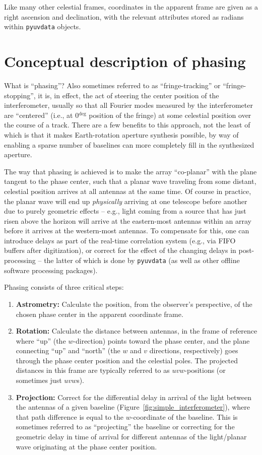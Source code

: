 \documentclass[11pt, oneside]{article}
\begin{document}
Like many other celestial frames, coordinates in the apparent frame are given as a right ascension and declination, with the relevant attributes stored as radians within \texttt{pyuvdata} objects.

\section{Conceptual description of phasing}\label{sec:concepts}
What is ``phasing''? Also sometimes referred to as ``fringe-tracking'' or ``fringe-stopping'', it is, in effect, the act of steering the center position of the interferometer, usually so that all Fourier modes measured by the interferometer are ``centered'' (i.e., at 0$^{\deg}$ position of the fringe) at some celestial position over the course of a track. There are a few benefits to this approach, not the least of which is that it makes Earth-rotation aperture synthesis possible, by way of enabling a sparse number of baselines can more completely fill in the synthesized aperture.

The way that phasing is achieved is to make the array ``co-planar'' with the plane tangent to the phase center, such that a planar wave traveling from some distant, celestial position arrives at all antennas at the same time. Of course in practice, the planar wave will end up \emph{physically} arriving at one telescope before another due to purely geometric effects -- e.g., light coming from a source that has just risen above the horizon will arrive at the eastern-most antennas within an array before it arrives at the western-most antennas. To compensate for this, one can introduce delays as part of the real-time correlation system (e.g., via FIFO buffers after digitization), or correct for the effect of the changing delays in post-processing -- the latter of which is done by \texttt{pyuvdata} (as well as other offline software processing packages).

Phasing consists of three critical steps:
\begin{enumerate}
    \item \textbf{Astrometry:} Calculate the position, from the observer's perspective, of the chosen phase center in the apparent coordinate frame. 
    \item \textbf{Rotation:} Calculate the distance between antennas, in the frame of reference where ``up'' (the $w$-direction) points toward the phase center, and the plane connecting ``up'' and ``north'' (the $w$ and $v$ directions, respectively) goes through the phase center position and the celestial poles. The projected distances in this frame are typically referred to as $uvw$-positions (or sometimes just $uvw$s).
    \item \textbf{Projection:} Correct for the differential delay in arrival of the light between the antennas of a given baseline (Figure~\ref{fig:simple_interferometer}), where that path difference is equal to the $w$-coordinate of the baseline. This is sometimes referred to as ``projecting'' the baseline or correcting for the geometric delay in time of arrival for different antennas of the light/planar wave originating at the phase center position.
\end{enumerate}
\end{document}
